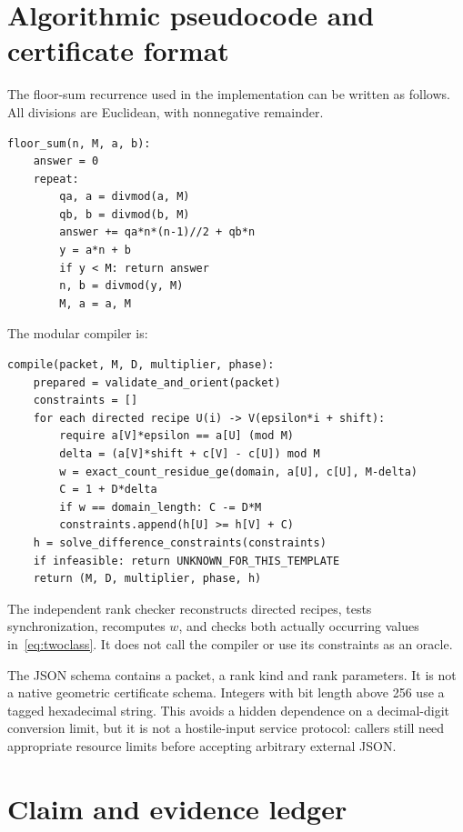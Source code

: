 \documentclass[11pt,letterpaper]{article}
\theoremstyle{definition}
\theoremstyle{remark}\newtheorem{remark}[theorem]{Remark}
\newcommand{\code}[1]{\texttt{\detokenize{#1}}}
\begin{document}
\appendix
\section{Algorithmic pseudocode and certificate format}
\label{app:algorithms}

The floor-sum recurrence used in the implementation can be written as follows. All divisions are Euclidean, with nonnegative remainder.
\begin{verbatim}
floor_sum(n, M, a, b):
    answer = 0
    repeat:
        qa, a = divmod(a, M)
        qb, b = divmod(b, M)
        answer += qa*n*(n-1)//2 + qb*n
        y = a*n + b
        if y < M: return answer
        n, b = divmod(y, M)
        M, a = a, M
\end{verbatim}

The modular compiler is:
\begin{verbatim}
compile(packet, M, D, multiplier, phase):
    prepared = validate_and_orient(packet)
    constraints = []
    for each directed recipe U(i) -> V(epsilon*i + shift):
        require a[V]*epsilon == a[U] (mod M)
        delta = (a[V]*shift + c[V] - c[U]) mod M
        w = exact_count_residue_ge(domain, a[U], c[U], M-delta)
        C = 1 + D*delta
        if w == domain_length: C -= D*M
        constraints.append(h[U] >= h[V] + C)
    h = solve_difference_constraints(constraints)
    if infeasible: return UNKNOWN_FOR_THIS_TEMPLATE
    return (M, D, multiplier, phase, h)
\end{verbatim}

The independent rank checker reconstructs directed recipes, tests synchronization, recomputes $w$, and checks both actually occurring values in~\eqref{eq:twoclass}. It does not call the compiler or use its constraints as an oracle.

The JSON schema \code{ranked-morse-v1} contains a packet, a rank kind and rank parameters. It is not a native geometric certificate schema. Integers with bit length above 256 use a tagged hexadecimal string. This avoids a hidden dependence on a decimal-digit conversion limit, but it is not a hostile-input service protocol: callers still need appropriate resource limits before accepting arbitrary external JSON.

\section{Claim and evidence ledger}
\label{app:ledger}
\end{document}
